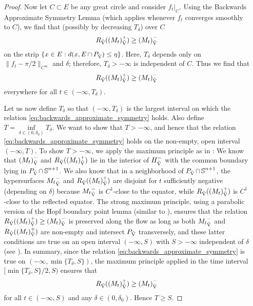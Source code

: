 \documentclass{amsart}
\theoremstyle{definition}
\theoremstyle{remark}
\numberwithin{equation}{section}
\begin{document}
\begin{proof}
Now let \(C\subset E\) be any great circle and consider \(f_t|_C\). Using the Backwards Approximate Symmetry Lemma \cite[Lemma 5.1]{Br-Lou} (which applies whenever \(f_t\) converges smoothly to \(C\)), we find that (possibly by decreasing \(T_{\delta}\)) over \(C\)
\[
R_{\operatorname{\vec{V}}}({(M_t)}_{\operatorname{\vec{V}}}^+) \geq {(M_t)}_{\operatorname{\vec{V}}}^-
\]
on the strip \(\{x \in E: d(x, E \operatorname{\cap} P_{\operatorname{\vec{V}}}) \leq \eta\}\). Here, \(T_{\delta}\) depends only on \(\|f_t - \pi/2\|_{C^{\infty}}\) and \(\delta\); therefore, \(T_{\delta} > - \infty\) is independent of \(C\). Thus we find that
\begin{equation}
\label{eq:backwards_approximate_symmetry}
R_{\operatorname{\vec{V}}}({(M_t)}_{\operatorname{\vec{V}}}^+) \geq {(M_t)}_{\operatorname{\vec{V}}}^-
\end{equation}
everywhere for all \(t \in (-\infty, T_{\delta})\).

Let us now define \(T_{\delta}\) so that \((-\infty, T_{\delta})\) is the largest interval on which the relation \eqref{eq:backwards_approximate_symmetry} holds. Also define \(T = \inf\limits_{\delta \in (0,\delta_0)} T_{\delta}\). We want to show that \(T > -\infty\), and hence that the relation \eqref{eq:backwards_approximate_symmetry} holds on the non-empty, open interval \((-\infty, T)\). To show $T>-\infty$, we apply the maximum principle as in \cite[Lemma 5.2]{Br-Lou}: We know that \({(M_t)}_{\operatorname{\vec{V}}}^-\) and \(R_{\operatorname{\vec{V}}}({(M_t)}_{\operatorname{\vec{V}}}^+)\) lie in the interior of \({H}_{{\operatorname{\vec{V}}}}^-\) with the common boundary lying in \(P_{\operatorname{\vec{V}}} \operatorname{\cap} \operatorname{\mathbb{S}}^{n+1}\). We also know that in a neighborhood of \(P_{\operatorname{\vec{V}}} \operatorname{\cap} \operatorname{\mathbb{S}}^{n+1}\), the hypersurfaces \({M_t}_{\operatorname{\vec{V}}}^-\) and \(R_{\operatorname{\vec{V}}}({(M_t)}_{\operatorname{\vec{V}}}^+)\) are disjoint for \(t\) sufficiently negative (depending on \(\delta\)) because \({M_t}_{\operatorname{\vec{V}}}^-\) is \(C^1\)-close to the equator, while \(R_{\operatorname{\vec{V}}}({(M_t)}_{\operatorname{\vec{V}}}^+)\) is \(C^1\)-close to the reflected equator. The strong maximum principle, using a parabolic version of the Hopf boundary point lemma (similar to \cite[Theorem 2.2]{Chow 97}), ensures that the  relation \(R_{\operatorname{\vec{V}}}({(M_t)}_{\operatorname{\vec{V}}}^+) \geq {(M_t)}_{\operatorname{\vec{V}}}^-\) is preserved along the flow as long as both \({M_t}_{\operatorname{\vec{V}}}^-\) and \(R_{\operatorname{\vec{V}}}({(M_t)}_{\operatorname{\vec{V}}}^+)\) are non-empty and intersect \(P_{\operatorname{\vec{V}}}\) transversely, and these latter conditions are true on an open interval \((-\infty, S)\) with \(S>-\infty\) independent of \(\delta\) (see \cite[Lemma 5.2]{Br-Lou}). In summary, since the relation \eqref{eq:backwards_approximate_symmetry} is true on \((-\infty, \min\{T_{\delta},S\})\), the maximum principle applied in the time interval $[\min\{T_{\delta},S\}/2,S)$ ensures that
\begin{equation*}
\label{eq:longtime_approximate_symmetry}
R_{\operatorname{\vec{V}}}({(M_t)}_{\operatorname{\vec{V}}}^+) \geq {(M_t)}_{\operatorname{\vec{V}}}^-
\end{equation*}
for all \(t \in (-\infty, S)\) and any \(\delta \in (0,\delta_0)\). Hence $T\ge S.$


\end{proof}
\end{document}
